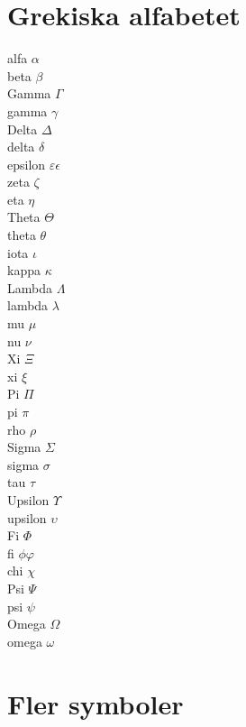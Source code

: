 \documentclass[12pt]{article}
\newcommand{\lowercaseheight}{1ex}
\newcommand{\uppercaseheight}{2ex}
\newcommand{\descenderdepth}{-0.5ex}
\newenvironment{drillsheet}{%
    \setlength\linenumbersep{0pt}%
    \renewcommand{\thelinenumber}{%
        \begin{tikzpicture}[overlay]
                \draw [black!25] ((0,0) -- ++(\textwidth,0);
                \draw [ultra thin,black!25] ((0,\lowercaseheight) -- ++(\textwidth,0);
                \draw [ultra thin,black!25] (0,\uppercaseheight - 0.1cm) -- ++(\textwidth,0);
                \draw [ultra thin,black!25] (0,\descenderdepth) -- ++(\textwidth,0);
        \end{tikzpicture}%
    }%
    \renewcommand\linenumberfont{\normalfont\color{black}}
    \begin{linenumbers}%
}{
    \end{linenumbers}%
}
\begin{document}
\section*{Grekiska alfabetet}
\Large
\begin{drillsheet}
    \noindent 
    alfa $\alpha$ \\ 
    beta $\beta$ \\ 
    Gamma $\Gamma$ \\ gamma $\gamma$ \\ 
    Delta $\Delta$ \\ delta $\delta$ \\
    epsilon $\varepsilon \epsilon$ \\ 
    zeta $\zeta$ \\ 
    eta $\eta$ \\ 
    Theta $\Theta$ \\ theta $\theta$ \\
    iota $\iota$ \\ 
    kappa $\kappa$ \\ 
    Lambda $\Lambda$ \\ lambda $\lambda$ \\ 
    mu $\mu$ \\ 
    nu $\nu$ \\
    Xi $\Xi$ \\ xi $\xi$ \\ 
    Pi $\Pi$ \\ pi $\pi$ \\
    rho $\rho$ \\ 
    Sigma $\Sigma$ \\ sigma $\sigma$ \\ 
    tau $\tau$ \\
    Upsilon $\Upsilon$ \\ upsilon $\upsilon$ \\
    Fi $\Phi$ \\ fi $\phi \varphi$ \\ 
    chi $\chi$ \\ 
    Psi $\Psi$ \\ psi $\psi$ \\ 
    Omega $\Omega$ \\ omega $\omega$
\end{drillsheet}

\newpage

\section*{Fler symboler}
\end{document}
